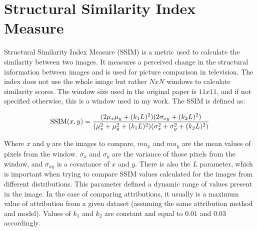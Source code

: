 \section{Structural Similarity Index Measure}

Structural Similarity Index Measure (SSIM) \cite{wang2004image} is a metric used to calculate the similarity between two images. It measures a perceived change in the structural information between images and is used for picture comparison in television. The index does not use the whole image but rather $NxN$ windows to calculate similarity scores. The window size used in the original paper is $11x11$, and if not specified otherwise, this is a window used in my work. The SSIM is defined as:

\begin{equation}
    {\displaystyle {\hbox{SSIM}}(x,y)={\frac {(2\mu _{x}\mu _{y}+(k_1L)^2)(2\sigma _{xy}+(k_2L)^2)}{(\mu _{x}^{2}+\mu _{y}^{2}+(k_1L)^2)(\sigma _{x}^{2}+\sigma _{y}^{2}+(k_2L)^2)}}}
    \label{eq:ssim}
\end{equation}

Where $x$ and $y$ are the images to compare, $mu _{x}$ and $mu _{y}$ are the mean values of pixels from the window. $\sigma _{x}$ and $\sigma _{y}$ are the variance of those pixels from the window, and $\sigma _{xy}$ is a covariance of $x$ and $y$. There is also the $L$ parameter, which is important when trying to compare SSIM values calculated for the images from different distributions. This parameter defined a dynamic range of values present in the image. In the case of comparing attributions, it usually is a maximum value of attribution from a given dataset (assuming the same attribution method and model). Values of $k_1$ and $k_2$ are constant and equal to $0.01$ and $0.03$ accordingly.

